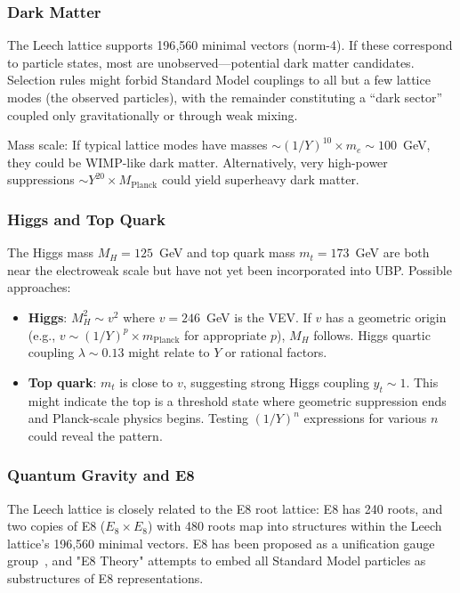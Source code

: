 \documentclass[11pt,a4paper]{article}
\begin{document}
\subsubsection{Dark Matter}

The Leech lattice supports 196{,}560 minimal vectors (norm-4). If these correspond to particle states, most are unobserved—potential dark matter candidates. Selection rules might forbid Standard Model couplings to all but a few lattice modes (the observed particles), with the remainder constituting a ``dark sector'' coupled only gravitationally or through weak mixing.

Mass scale: If typical lattice modes have masses $\sim (1/Y)^{10} \times m_e \sim 100$~GeV, they could be WIMP-like dark matter. Alternatively, very high-power suppressions $\sim Y^{20} \times M_{\text{Planck}}$ could yield superheavy dark matter.

\subsubsection{Higgs and Top Quark}

The Higgs mass $M_H = 125$~GeV and top quark mass $m_t = 173$~GeV are both near the electroweak scale but have not yet been incorporated into UBP. Possible approaches:
\begin{itemize}
\item \textbf{Higgs}: $M_H^2 \sim v^2$ where $v = 246$~GeV is the VEV. If $v$ has a geometric origin (e.g., $v \sim (1/Y)^p \times m_{\text{Planck}}$ for appropriate $p$), $M_H$ follows. Higgs quartic coupling $\lambda \sim 0.13$ might relate to $Y$ or rational factors.

\item \textbf{Top quark}: $m_t$ is close to $v$, suggesting strong Higgs coupling $y_t \sim 1$. This might indicate the top is a threshold state where geometric suppression ends and Planck-scale physics begins. Testing $(1/Y)^n$ expressions for various $n$ could reveal the pattern.
\end{itemize}

\subsubsection{Quantum Gravity and E8}

The Leech lattice is closely related to the E8 root lattice: E8 has 240 roots, and two copies of E8 ($E_8 \times E_8$) with 480 roots map into structures within the Leech lattice's 196{,}560 minimal vectors. E8 has been proposed as a unification gauge group~\cite{ref011}, and "E8 Theory" attempts to embed all Standard Model particles as substructures of E8 representations.
\end{document}
